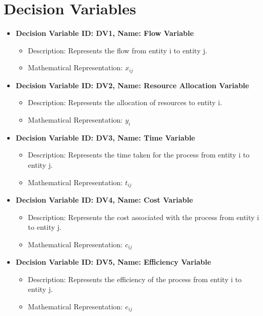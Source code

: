 \documentclass{article}
\begin{document}
\section{Decision Variables}
\begin{itemize}
    \item \textbf{Decision Variable ID: DV1, Name: Flow Variable}
    \begin{itemize}
        \item Description: Represents the flow from entity i to entity j.
        \item Mathematical Representation: $x_{ij}$
    \end{itemize}

    \item \textbf{Decision Variable ID: DV2, Name: Resource Allocation Variable}
    \begin{itemize}
        \item Description: Represents the allocation of resources to entity i.
        \item Mathematical Representation: $y_i$
    \end{itemize}

    \item \textbf{Decision Variable ID: DV3, Name: Time Variable}
    \begin{itemize}
        \item Description: Represents the time taken for the process from entity i to entity j.
        \item Mathematical Representation: $t_{ij}$
    \end{itemize}

    \item \textbf{Decision Variable ID: DV4, Name: Cost Variable}
    \begin{itemize}
        \item Description: Represents the cost associated with the process from entity i to entity j.
        \item Mathematical Representation: $c_{ij}$
    \end{itemize}

    \item \textbf{Decision Variable ID: DV5, Name: Efficiency Variable}
    \begin{itemize}
        \item Description: Represents the efficiency of the process from entity i to entity j.
        \item Mathematical Representation: $e_{ij}$
    \end{itemize}
\end{itemize}
\end{document}
